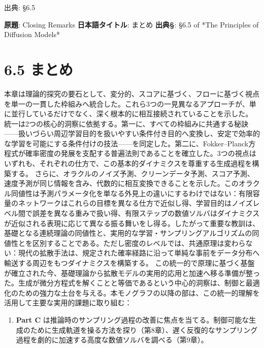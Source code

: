 

{\color{gray}\footnotesize 出典: §6.5\par}
\vspace{0.2em}
\begin{propositionbox}[原題]
\textbf{原題}: Closing Remarks
\textbf{日本語タイトル}: まとめ
\textbf{出典§}: §6.5 of *The Principles of Diffusion Models*
\end{propositionbox}


\section*{6.5 まとめ}


本章は理論的探究の要石として、変分的、スコアに基づく、フローに基づく視点を単一の一貫した枠組みへ統合した。これら3つの一見異なるアプローチが、単に並行しているだけでなく、深く根本的に相互接続されていることを示した。
統一は2つの核心的洞察に依拠する。第一に、すべての枠組みに共通する秘訣——扱いづらい周辺学習目的を扱いやすい条件付き目的へ変換し、安定で効率的な学習を可能にする条件付けの技法——を同定した。第二に、Fokker–Planck方程式が確率密度の発展を支配する普遍法則であることを確立した。3つの視点はいずれも、それぞれの仕方で、この基本的ダイナミクスを尊重する生成過程を構築する。
さらに、オラクルのノイズ予測、クリーンデータ予測、スコア予測、速度予測が同じ情報を含み、代数的に相互変換できることを示した。このオラクル同値性は予測パラメータ化を単なる外見上の違いにするわけではない：有限容量のネットワークはこれらの目標を異なる仕方で近似し得、学習目的はノイズレベル間で誤差を異なる重みで扱い得、有限ステップの数値ソルバはダイナミクスが近似される表現に応じて異なる振る舞いをし得る。したがって重要な教訓は、基礎となる連続理論の同値性と、実用的な学習・サンプリングアルゴリズムの同値性とを区別することである。ただし密度のレベルでは、共通原理は変わらない：現代の拡散手法は、規定された確率経路に沿って単純な事前をデータ分布へ輸送する周辺をもつダイナミクスを構築する。
この統一的で原理に基づく基盤が確立された今、基礎理論から拡散モデルの実用的応用と加速へ移る準備が整った。生成が微分方程式を解くことと等価であるという中心的洞察は、制御と最適化のための強力な土台を与える。本モノグラフの以降の部は、この統一的理解を活用して主要な実用的課題に取り組む：

\begin{enumerate}
\item \textbf{Part C} は推論時のサンプリング過程の改善に焦点を当てる。制御可能な生成のために生成軌道を操る方法を探り（第8章）、遅く反復的なサンプリング過程を劇的に加速する高度な数値ソルバを調べる（第9章）。
\end{enumerate}



